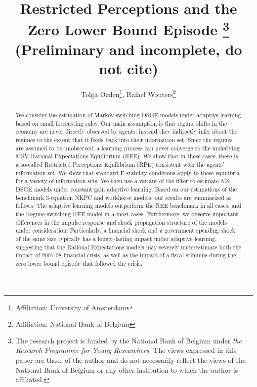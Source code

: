 \documentclass[12pt,reqno]{article}
\title{Restricted Perceptions and the Zero Lower Bound Episode \footnote{The research project is funded by the National Bank of Belgium under \textit{the Research Programme for Young Researchers}. The views expressed in this paper are those of the author and do not necessarily reflect the views 
of the National Bank of Belgium or any other institution to which the author is affiliated.}\vspace{10 mm} \\ (Preliminary and incomplete, do not cite) }
\author{Tolga Ozden\footnote{Affiliation: University of Amsterdam}, Rafael Wouters\footnote{Affiliation: National Bank of Belgium}}
\numberwithin{equation}{section}
\begin{document}
\maketitle



\begin{abstract}

We consider the estimation of Markov-switching DSGE models under adaptive learning based on small forecasting rules. Our main assumption is that regime shifts in the economy are never directly observed by agents; instead they indirectly infer about the regimes to the extent that it feeds back into their information set. Since the regimes are assumed to be unobserved, a learning process can never converge to the underlying MSV-Rational Expectations Equilibrium (REE). We show that in these cases, there is a so-called Restricted Perceptions Equilibrium (RPE) consistent with the agents' information set. We show that standard E-stability conditions apply to these equilibria for a variety of information sets. We then use a variant of the  \cite{kim1999state} filter to estimate MS-DSGE models under constant gain adaptive learning. Based on our estimations of the benchmark 3-equation NKPC and workhorse \cite{smets2007shocks} models, our results are summarized as follows: The adaptive learning models outperform the REE benchmark in all cases, and the Regime-switching REE model in a most cases. Furthermore, we observe important differences in the impulse response and shock propagation structure of the models under consideration. Particularly, a financial shock and a government spending shock of the same size typically has a longer-lasting impact under adaptive learning, suggesting that the Rational Expectations models may severely underestimate both the impact of 2007-08 financial crisis, as well as the impact of a fiscal stimulus during the zero lower bound episode that followed the crisis.  

\end{abstract}
\end{document}
